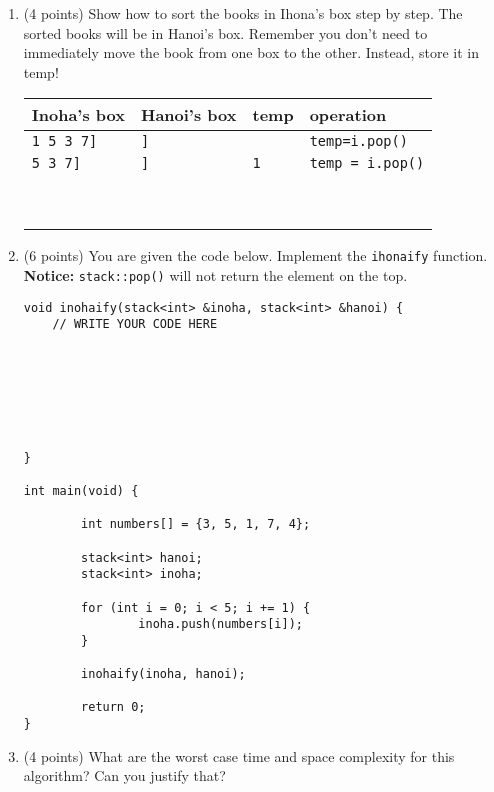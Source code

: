 \documentclass[11pt]{article}
\begin{document}
\begin{enumerate}
\begin{enumerate}
\item (4 points) Show how to sort the books in Ihona's box step by step. The sorted books will be in Hanoi's box. Remember you don't need to immediately move the book from one box to the other. Instead, store it in temp!

\begin{tabular}{l|l|l|l}
Inoha's box      & Hanoi's box & temp   &   operation\\\hline
{\tt 1 5 3 7]} & {\tt ]}     &        &   {\tt temp=i.pop()}\\\hline
{\tt 5 3 7]} &  {\tt ]} & {\tt 1} & {\tt temp = i.pop()}\\\hline
&&&\\\hline
&&&\\\hline
&&&\\\hline
&&&\\\hline
&&&\\\hline
&&&\\\hline
&&&\\\hline
&&&\\\hline
&&&\\\hline
\end{tabular}
\newpage
\item (6 points) You are given the code below. Implement the {\tt ihonaify} function. {\bf Notice:} {\tt stack::pop()} will not return the element on the top.

\begin{lstlisting}
void inohaify(stack<int> &inoha, stack<int> &hanoi) {
	// WRITE YOUR CODE HERE
    
    
    
    
    
    
    
}

int main(void) {

        int numbers[] = {3, 5, 1, 7, 4};

        stack<int> hanoi;
        stack<int> inoha;

        for (int i = 0; i < 5; i += 1) {
                inoha.push(numbers[i]);
        }

        inohaify(inoha, hanoi);

        return 0;
}
\end{lstlisting}

\item (4 points) What are the worst case time and space complexity for this algorithm? Can you justify that?


\end{enumerate}
\end{enumerate}
\end{document}
